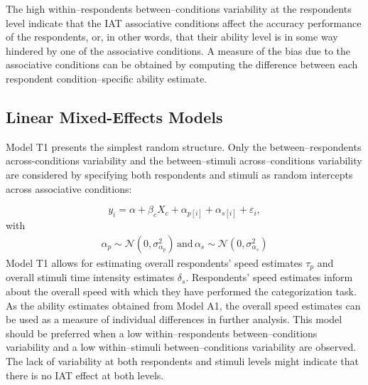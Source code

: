 \documentclass[12pt]{book}
\begin{document}
The high within--respondents between--conditions variability at the respondents level indicate that the IAT associative conditions affect the accuracy performance of the respondents, or, in other words, that their ability level is in some way hindered by one of the associative conditions.
A measure of the bias due to the associative conditions can be obtained by computing the difference between each respondent condition--specific ability estimate. 
 

\subsection[LMMs]{Linear Mixed-Effects Models}\label{sub:logtimemodels}

Model T1 presents the simplest random structure. Only the between--respondents across-conditions variability and the between--stimuli across--conditions variability are considered by specifying both respondents and stimuli as random intercepts across associative conditions: 

\begin{equation}\label{LogtimeMin}
	y_{i} = \alpha + \beta_cX_c + \alpha_{p[i]} +  \alpha_{s[i]} + \varepsilon_{i},
\end{equation}
with
\begin{align}
	\alpha_{p} \sim  \mathcal{N} ( 0, \sigma_{\alpha_p}^2) \, \text{and} \, \alpha_{s}  \sim  \mathcal{N} (0,\sigma_{\alpha_s}^2)
\end{align}
Model T1 allows for estimating overall respondents' speed estimates $\tau_{p}$ and overall stimuli time intensity estimates $\delta_s$. 
Respondents' speed estimates inform about the overall speed with which they have performed the categorization task. As the ability estimates obtained from Model A1, the overall speed estimates can be used as a measure of individual differences in further analysis. This model should be preferred when a low within--respondents between--conditions variability and a low within--stimuli between--conditions variability are observed. 
The lack of variability at both respondents and stimuli levels might indicate that there is no IAT effect at both levels. 
\end{document}
